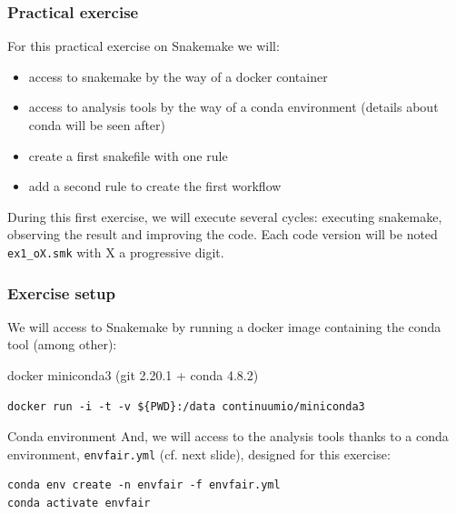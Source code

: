 \begin{frame}[containsverbatim]
\frametitle{Practical exercise}
\begin{exampleblock}{}
For this practical exercise on Snakemake we will:
\begin{itemize}
    \item access to snakemake by the way of a docker container
    \item access to analysis tools by the way of a conda environment (details about conda will be seen after)
    \item create a first snakefile with one rule
    \item add a second rule to create the first workflow
\end{itemize}
During this first exercise, we will execute several cycles: executing snakemake, observing the result and improving the code. Each code version will be noted \verb|ex1_oX.smk| with X a progressive digit.
\end{exampleblock}
\end{frame}
\begin{frame}[containsverbatim]
\frametitle{Exercise setup}
We will access to Snakemake by running a docker image containing the conda tool (among other):
\begin{exampleblock}{docker miniconda3 (git 2.20.1 + conda 4.8.2)}
\begin{lstlisting}
docker run -i -t -v ${PWD}:/data continuumio/miniconda3
\end{lstlisting}
\end{exampleblock}


\begin{exampleblock}{Conda environment}
And, we will access to the analysis tools thanks to a conda environment, \verb|envfair.yml| (cf. next slide), designed for this exercise:
\begin{lstlisting}
conda env create -n envfair -f envfair.yml
conda activate envfair
\end{lstlisting}
\end{exampleblock}
\end{frame}
